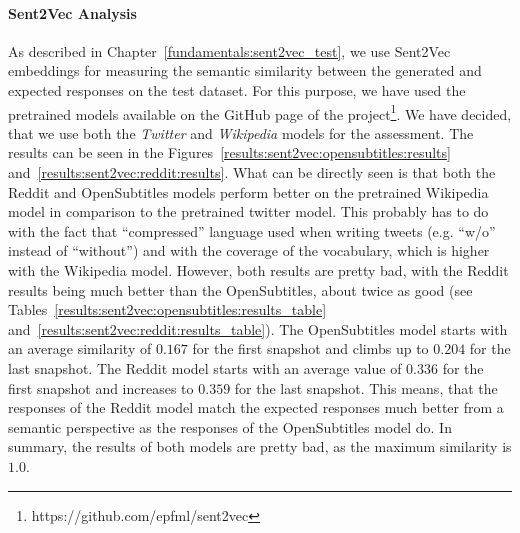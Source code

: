 \paragraph{Sent2Vec Analysis} As described in Chapter~\ref{fundamentals:sent2vec_test}, we use Sent2Vec embeddings for measuring the semantic similarity between the generated and expected responses on the test dataset. For this purpose, we have used the pretrained models available on the GitHub page of the project\footnote{https://github.com/epfml/sent2vec}. We have decided, that we use both the \emph{Twitter} and \emph{Wikipedia} models for the assessment. The results can be seen in the Figures~\ref{results:sent2vec:opensubtitles:results} and~\ref{results:sent2vec:reddit:results}. What can be directly seen is that both the Reddit and OpenSubtitles models perform better on the pretrained Wikipedia model in comparison to the pretrained twitter model. This probably has to do with the fact that ``compressed'' language used when writing tweets (e.g. ``w/o'' instead of ``without'') and with the coverage of the vocabulary, which is higher with the Wikipedia model. However, both results are pretty bad, with the Reddit results being much better than the OpenSubtitles, about twice as good (see Tables~\ref{results:sent2vec:opensubtitles:results_table} and~\ref{results:sent2vec:reddit:results_table}). The OpenSubtitles model starts with an average similarity of $0.167$ for the first snapshot and climbs up to $0.204$ for the last snapshot. The Reddit model starts with an average value of $0.336$ for the first snapshot and increases to $0.359$ for the last snapshot. This means, that the responses of the Reddit model match the expected responses much better from a semantic perspective as the responses of the OpenSubtitles model do. In summary, the results of both models are pretty bad, as the maximum similarity is $1.0$.

